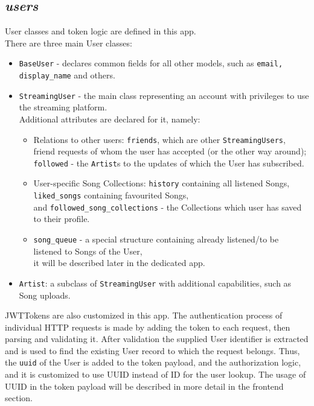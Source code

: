 \subsection{\textit{users}}
User classes and token logic are defined in this app.\\
There are three main User classes:
\begin{itemize}
    \item \texttt{BaseUser} - declares common fields for all other models, such as \texttt{email, display\_name} and others.
    \item \texttt{StreamingUser} - the main class representing an account with privileges to use the streaming platform.\\
    Additional attributes are declared for it, namely:
    \begin{itemize}
        \item Relations to other users: \texttt{friends}, which are other \texttt{StreamingUsers},\\
        friend requests of whom the user has accepted (or the other way around);\\
        \texttt{followed} - the \texttt{Artist}s to the updates of which the User has subscribed.
        \item User-specific Song Collections: \texttt{history} containing all listened Songs,\\
        \texttt{liked\_songs} containing favourited Songs,\\
        and \texttt{followed\_song\_collections} - the Collections which user has saved to their profile.
        \item \texttt{song\_queue} - a special structure containing already listened/to be listened to Songs of the User,\\
        it will be described later in the dedicated app.
    \end{itemize}
    \item \texttt{Artist}: a subclass of \texttt{StreamingUser} with additional capabilities, such as Song uploads.
\end{itemize}

JWTTokens are also customized in this app. The authentication process of individual HTTP requests is made by adding the
token to each request, then parsing and validating it. After validation the supplied User identifier is extracted and
is used to find the existing User record to which the request belongs. Thus, the \texttt{uuid} of the User is added to the token payload, and
the authorization logic, and it is customized to use UUID instead of ID for the user lookup.
The usage of UUID in the token payload will be described in more detail in the frontend section.

